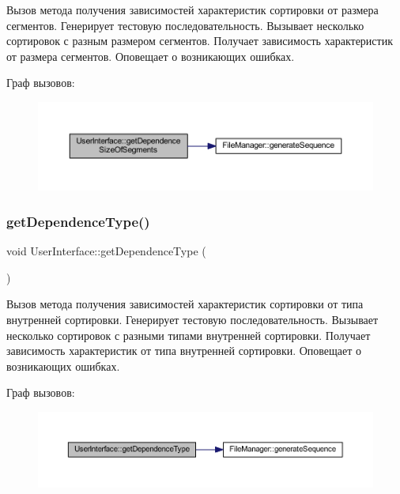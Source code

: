 Вызов метода получения зависимостей характеристик сортировки от размера сегментов. Генерирует тестовую последовательность. Вызывает несколько сортировок с разным размером сегментов. Получает зависимость характеристик от размера сегментов. Оповещает о возникающих ошибках. 

Граф вызовов\+:\nopagebreak
\begin{figure}[H]
\begin{center}
\leavevmode
\includegraphics[width=350pt]{class_user_interface_aaac8a635efdb79276275f9d1ea265cd7_cgraph}
\end{center}
\end{figure}
\hypertarget{class_user_interface_ab726cdce7e7518aae70cf42594139589}{}\label{class_user_interface_ab726cdce7e7518aae70cf42594139589} 
\subsubsection{\texorpdfstring{get\+Dependence\+Type()}{getDependenceType()}}
{\footnotesize\ttfamily void User\+Interface\+::get\+Dependence\+Type (\begin{DoxyParamCaption}{ }\end{DoxyParamCaption})\hspace{0.3cm}{\ttfamily [private]}}



Вызов метода получения зависимостей характеристик сортировки от типа внутренней сортировки. Генерирует тестовую последовательность. Вызывает несколько сортировок с разными типами внутренней сортировки. Получает зависимость характеристик от типа внутренней сортировки. Оповещает о возникающих ошибках. 

Граф вызовов\+:\nopagebreak
\begin{figure}[H]
\begin{center}
\leavevmode
\includegraphics[width=350pt]{class_user_interface_ab726cdce7e7518aae70cf42594139589_cgraph}
\end{center}
\end{figure}
\hypertarget{class_user_interface_a6c7f9ef9faa40eaf4760d57e89228786}{}\label{class_user_interface_a6c7f9ef9faa40eaf4760d57e89228786} 
